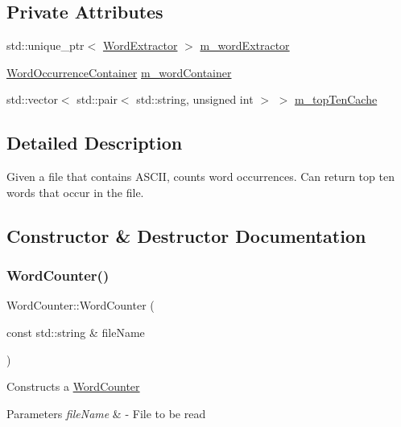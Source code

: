 \subsection*{Private Attributes}
\begin{DoxyCompactItemize}
\item 
std\+::unique\+\_\+ptr$<$ \mbox{\hyperlink{class_word_extractor}{Word\+Extractor}} $>$ \mbox{\hyperlink{class_word_counter_aefb9611fa991d6e0e7dccd64403150cb}{m\+\_\+word\+Extractor}}
\item 
\mbox{\hyperlink{class_word_occurrence_container}{Word\+Occurrence\+Container}} \mbox{\hyperlink{class_word_counter_a7f867e08264a28ccfc65972bc42e409b}{m\+\_\+word\+Container}}
\item 
std\+::vector$<$ std\+::pair$<$ std\+::string, unsigned int $>$ $>$ \mbox{\hyperlink{class_word_counter_ab38650b6b6b1e07168682573f7923d24}{m\+\_\+top\+Ten\+Cache}}
\end{DoxyCompactItemize}


\subsection{Detailed Description}
Given a file that contains A\+S\+C\+II, counts word occurrences. Can return top ten words that occur in the file. 

\subsection{Constructor \& Destructor Documentation}
\mbox{\label{class_word_counter_affea0f9dd574ac25eb447a161b4e9c22}} 
\subsubsection{\texorpdfstring{Word\+Counter()}{WordCounter()}}
{\footnotesize\ttfamily Word\+Counter\+::\+Word\+Counter (\begin{DoxyParamCaption}\item[{const std\+::string \&}]{file\+Name }\end{DoxyParamCaption})}

Constructs a \mbox{\hyperlink{class_word_counter}{Word\+Counter}} 
\begin{DoxyParams}{Parameters}
{\em file\+Name} & -\/ File to be read \\
\hline
\end{DoxyParams}

